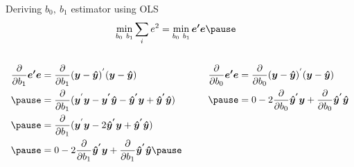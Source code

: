\documentclass[aspectratio=169, handout]{beamer}
\numberwithin{equation}{section}
\begin{document}
\begin{frame}{Deriving $b_0,\ b_1$ estimator using OLS}
 \begin{align*}
  &\min_{b_0\ b_1} \sum_i e^2=\min_{b_0\ b_1} \bm{e'}\bm{e}\pause
\end{align*} 
  \begin{columns}
  \begin{column}{.4\textwidth}
 \begin{align*}
  \frac{\partial}{\partial b_1}\bm{e'}\bm{e}&= \frac{\partial}{\partial b_1} (\bm{y}-\bm{\hat{y}})^{'} (\bm{y}-\bm{\hat{y}})\\\pause
&= \frac{\partial}{\partial b_1} (\bm{y}^{'}\bm{y}-\bm{y^{'}}\bm{\hat{y}}- \bm{\hat{y}^{'}}\bm{y}+\bm{\hat{y}^{'}}\bm{\hat{y}})\\\pause
&= \frac{\partial}{\partial b_1} (\bm{y}^{'}\bm{y}-2\bm{\hat{y}^{'}}\bm{y}+\bm{\hat{y}^{'}}\bm{\hat{y}})\\\pause
&= 0-2\frac{\partial}{\partial b_1}\bm{\hat{y}^{'}y}+\frac{\partial}{\partial b_1}\bm{\hat{y}^{'}}\bm{\hat{y}}\pause
\end{align*}
\end{column}
  \begin{column}{.4\textwidth}
 \begin{align*}
  \frac{\partial}{\partial b_0}\bm{e'}\bm{e}&= \frac{\partial}{\partial b_0} (\bm{y}-\bm{\hat{y}})^{'} (\bm{y}-\bm{\hat{y}})\\\pause
 &= 0-2\frac{\partial}{\partial b_0}\bm{\hat{y}^{'}y}+\frac{\partial}{\partial b_0}\bm{\hat{y}^{'}}\bm{\hat{y}}
\end{align*}
  \end{column}
  \end{columns}
\end{frame}
\end{document}
